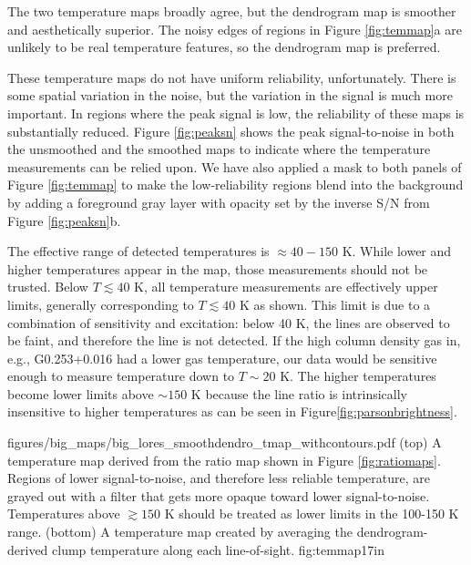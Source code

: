 The two temperature maps broadly agree, but the dendrogram map is smoother and
aesthetically superior.  The noisy edges of regions in Figure \ref{fig:temmap}a
are unlikely to be real temperature features, so the dendrogram map is
preferred.

These temperature maps do not have uniform reliability, unfortunately.  There
is some spatial variation in the noise, but the variation in the signal is much
more important.  In regions where the peak signal is low, the reliability of
these maps is substantially reduced.  Figure \ref{fig:peaksn} shows the peak
signal-to-noise in both the unsmoothed and the smoothed maps to indicate where
the temperature measurements can be relied upon.  We have also applied a mask
to both panels of Figure \ref{fig:temmap} to make the low-reliability regions
blend into the background by adding a foreground gray layer with opacity set by
the inverse S/N from Figure \ref{fig:peaksn}b.

The effective range of detected temperatures is $\approx40-150$ K. While lower
and higher temperatures appear in the map, those measurements should not be
trusted.  Below $T\lesssim40$ K, all temperature measurements are effectively
upper limits, generally corresponding to $T\lesssim40$ K as shown.  This limit
is due to a combination of sensitivity and excitation: below 40 K, the \para
lines are observed to be faint, and therefore the \threetwoone line is not
detected.  If the high column density gas in, e.g., G0.253+0.016 had a lower
gas temperature, our data would be sensitive enough to measure temperature down
to $T\sim20$ K.  The higher temperatures become lower limits above $\sim150$ K
because the \para line ratio is intrinsically insensitive to higher
temperatures as can be seen in Figure\ref{fig:parsonbrightness}.

            {figures/big_maps/big_lores_smoothdendro_tmap_withcontours.pdf}
{(top) A temperature map derived from the \Rone ratio map shown
in Figure \ref{fig:ratiomaps}.  Regions of lower signal-to-noise, and therefore less
reliable temperature, are grayed out with a filter that gets more opaque
toward lower signal-to-noise.  Temperatures above $\gtrsim150$ K should be
treated as lower limits in the 100-150 K range.
(bottom) A temperature map created by averaging the dendrogram-derived clump temperature
along each line-of-sight.
}
{fig:temmap}{1}{7in}

